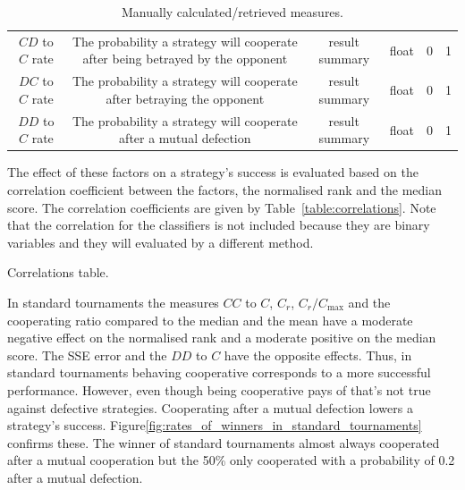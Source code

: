 \documentclass{article}
\begin{document}
\begin{table}[h]
\begin{center}
{\begin{tabular}{gcgcgc}
$CD$ to $C$ rate & The probability a strategy will cooperate after being betrayed by the opponent & result summary & float & 0 & 1 \\
$DC$ to $C$ rate & The probability a strategy will cooperate after betraying the opponent & result summary & float & 0 & 1 \\
$DD$ to $C$ rate & The probability a strategy will cooperate after a mutual defection & result summary & float & 0 & 1 \\
    \bottomrule
        \end{tabular}}
    \end{center}
    \caption{Manually calculated/retrieved measures.}
    \label{table:manual_measures}
\end{table}


The effect of these factors on a strategy's success is evaluated based on the
correlation coefficient between the factors, the normalised rank and the median
score. The correlation coefficients are given by Table~\ref{table:correlations}.
Note that the correlation for the classifiers is not included because they are
binary variables and they will evaluated by a different method. 


\begin{table}[!htbp]
    \begin{center}
    \resizebox{.8\textwidth}{!}{
        
    }
\end{center}
\caption{Correlations table.}\label{table:correlations}
\end{table}

In standard tournaments the measures  $CC$ to $C$, $C_r$, $C_r / C_{\text{max}}$
and the cooperating ratio compared to the median and the mean have a moderate
negative effect on the normalised rank and a moderate positive on the median
score. The SSE error and the $DD$ to $C$ have the opposite effects. Thus, in
standard tournaments behaving cooperative corresponds to a more successful
performance. However, even though being cooperative pays of that's not true
against defective strategies. Cooperating after a mutual defection lowers a
strategy's success. Figure\ref{fig:rates_of_winners_in_standard_tournaments}
confirms these. The winner of standard tournaments almost always cooperated
after a mutual cooperation but the 50\% only cooperated with a probability
of 0.2 after a mutual defection.
\end{document}
